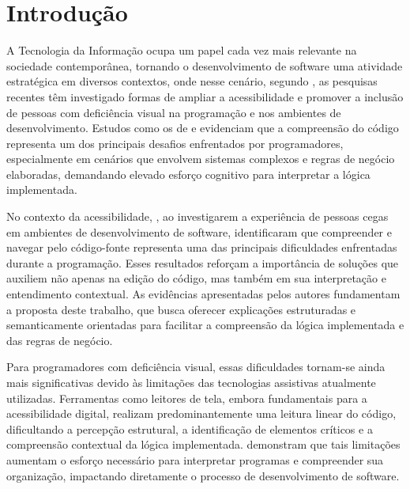 \documentclass[
    12pt,                   %
    openright,              %
    oneside,                %
    a4paper,                %
    sumario=tradicional,    %
    english,                %
    brazil,                 %
    ]{abntex2}
\begin{document}
\tableofcontents*
\cleardoublepage

\textual

\chapter{Introdução}\label{sec:introducao}
A Tecnologia da Informação ocupa um papel cada vez mais relevante na sociedade contemporânea, tornando o desenvolvimento de software uma atividade estratégica em diversos contextos, onde nesse cenário, segundo \textcite{acad54431201}, as pesquisas recentes têm investigado formas de ampliar a acessibilidade e promover a inclusão de pessoas com deficiência visual na programação e nos ambientes de desenvolvimento. Estudos como os de \textcite{latinoware20457} e \textcite{acad54431201} evidenciam que a compreensão do código representa um dos principais desafios enfrentados por programadores, especialmente em cenários que envolvem sistemas complexos e regras de negócio elaboradas, demandando elevado esforço cognitivo para interpretar a lógica implementada.

No contexto da acessibilidade, \textcite{latinoware20457}, ao investigarem a experiência de pessoas cegas em ambientes de desenvolvimento de software, identificaram que compreender e navegar pelo código-fonte representa uma das principais dificuldades enfrentadas durante a programação. Esses resultados reforçam a importância de soluções que auxiliem não apenas na edição do código, mas também em sua interpretação e entendimento contextual. As evidências apresentadas pelos autores fundamentam a proposta deste trabalho, que busca oferecer explicações estruturadas e semanticamente orientadas para facilitar a compreensão da lógica implementada e das regras de negócio.

Para programadores com deficiência visual, essas dificuldades tornam-se ainda mais significativas devido às limitações das tecnologias assistivas atualmente utilizadas. Ferramentas como leitores de tela, embora fundamentais para a acessibilidade digital, realizam predominantemente uma leitura linear do código, dificultando a percepção estrutural, a identificação de elementos críticos e a compreensão contextual da lógica implementada. \textcite{acad54431201} demonstram que tais limitações aumentam o esforço necessário para interpretar programas e compreender sua organização, impactando diretamente o processo de desenvolvimento de software.
\end{document}
